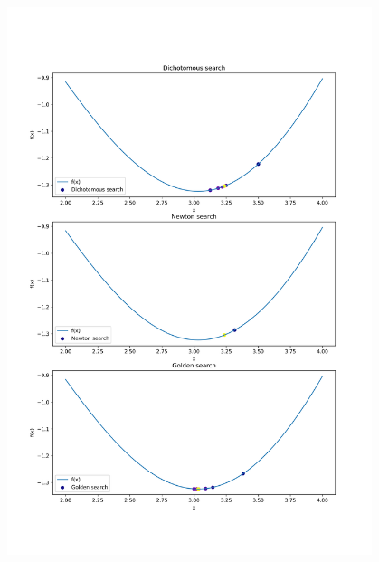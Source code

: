 {\begin{td-sol}
\begin{enumerate}
            \begin{center}
                \includegraphics[width=0.8\textwidth]{../assets/code_12_graph.png}
            \end{center}
        \end{enumerate}
    \end{td-sol}
}{}